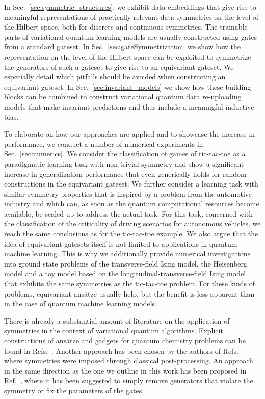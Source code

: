 \documentclass[a4paper,twocolumn,notitlepage,nofootinbib,superscriptaddress,floatfix]{revtex4-2}
\begin{document}
In Sec.~\ref{sec:symmetric_structures}, we exhibit data embeddings that give rise to meaningful representations of practically relevant data symmetries on the level of the Hilbert space, both for discrete and continuous symmetries. 
The trainable parts of variational quantum learning models are usually constructed using gates from a standard gateset.
In Sec.~\ref{sec:gateSymmetrization} we show how the representation on the level of the Hilbert space can be exploited to symmetrize the generators of such a gateset to give rise to an equivariant gateset. We especially detail which pitfalls should be avoided when constructing an equivariant gateset.
In Sec.~\ref{sec:invariant_models} we show how these building blocks can be combined to construct variational quantum data re-uploading models that make invariant predictions and thus include a meaningful inductive bias.

To elaborate on how our approaches are applied and to showcase the increase in performance, we conduct a number of numerical experiments in Sec.~\ref{sec:numerics}. We consider the 
classification of games of tic-tac-toe as a paradigmatic learning task with non-trivial symmetry and show a significant increase in generalization performance that even generically holds for random constructions in the equivariant gateset. We further consider a learning task with similar symmetry properties that is inspired by a problem from the automotive industry and which can, as soon as the quantum computational resources become available, be scaled up to address the actual task. For this task, concerned with the classification of the criticality of driving scenarios for autonomous vehicles, we reach the same conclusions as for the tic-tac-toe example. We also argue that the idea of equivariant gatesets itself is not limited to applications in quantum machine learning. This is why we additionally provide numerical investigations into ground state problems of the transverse-field Ising model, the Heisenberg model and a toy model based on the longitudinal-transverse-field Ising model that exhibits the same symmetries as the tic-tac-toe problem. For these kinds of problems, equivariant ansätze usually help, but the benefit is less apparent than in the case of quantum machine learning models.

There is already a substantial amount of literature on the application of symmetries in the context of variational quantum algorithms. Explicit constructions of ansätze and gadgets for quantum chemistry problems can be found in Refs.~\cite{liu2019variational,gard2020efficient,setia2020reducing,anselmetti2021local,arrazola2021universal,vogt2021preparing,zhang2021shallow-circuit,barron2021preserving}. Another approach has been chosen by the authors of Refs.~\cite{seki2020symmetry-adapted,seki2022spatial} where symmetries were imposed through classical post-processing. An approach in the same direction as the one we outline in this work has been proposed in Ref.~\cite{herasymenko2021diagrammatic}, where it has been suggested to simply remove generators that violate the symmetry or fix the parameters of the gates. 
\end{document}
